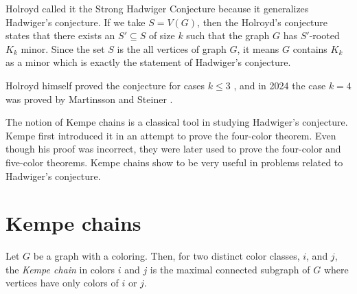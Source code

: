 Holroyd called it the Strong Hadwiger Conjecture because it generalizes Hadwiger's conjecture. If we take $S = V(G)$,
then the Holroyd's conjecture states that there exists an $S' \subseteq S$ of size $k$ such that the graph $G$ has $S'$-rooted $K_k$ minor. 
Since the set $S$ is the all vertices of graph $G$, it means $G$ contains $K_k$ as a minor
which is exactly the statement of Hadwiger's conjecture.

Holroyd himself proved the conjecture for cases $k \leq 3$ \cite{Holroyd1997}, and in 2024  the case
$k = 4$ was proved by Martinsson and Steiner \cite{MARTINSSON20241}.

The notion of Kempe chains is a classical tool in studying Hadwiger's conjecture. Kempe first introduced it in an attempt
to prove the four-color theorem. Even though his proof was incorrect, they were later used to prove the four-color and five-color theorems.
Kempe chains show to be very useful in problems related to Hadwiger's conjecture.

\section{Kempe chains}

\begin{defn}
 Let $G$ be a graph with a coloring. Then, for two distinct color classes, $i$, and $j$, the \emph{Kempe chain}
 in colors $i$ and $j$ is the maximal connected subgraph of $G$ where vertices have only colors of $i$ or $j$.
\end{defn}

